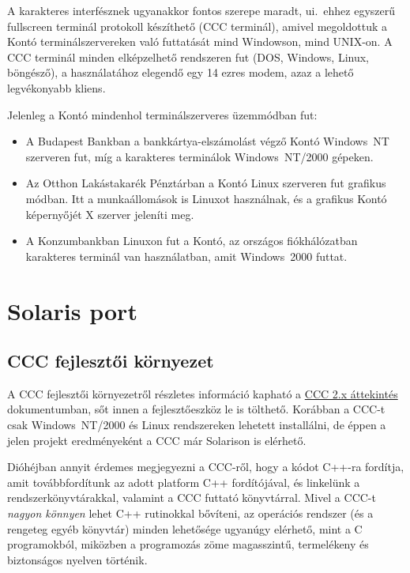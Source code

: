 A karakteres interfésznek ugyanakkor fontos szerepe maradt, ui.\
ehhez egyszerű fullscreen terminál protokoll készíthető (CCC terminál), 
amivel megoldottuk a Kontó terminálszervereken való futtatását mind Windowson,
mind UNIX-on. A CCC terminál minden elképzelhető rendszeren fut
(DOS, Windows, Linux, böngésző), a használatához elegendő egy 14 ezres
modem, azaz a lehető legvékonyabb kliens.

Jelenleg a Kontó mindenhol terminálszerveres üzemmódban fut:
\begin{itemize}
\item 
   A Budapest Bankban a bankkártya-elszámolást végző Kontó
   Windows~NT szerveren fut, míg a karakteres terminálok 
   Windows~NT/2000 gépeken.
\item 
   Az Otthon Lakástakarék Pénztárban a Kontó Linux szerveren fut
   grafikus módban. Itt a munkaállomások is Linuxot használnak, 
   és a grafikus Kontó képernyőjét X szerver jeleníti meg.
\item 
   A Konzumbankban Linuxon fut a Kontó, az országos fiókhálózatban
   karakteres terminál van használatban, amit Windows~2000 futtat.
\end{itemize}
 

\section{Solaris port}

\subsection{CCC fejlesztői környezet}

A CCC fejlesztői környezetről részletes információ kapható
a \href{http://www.comfirm.hu/ccc2/ccc2.html}{CCC 2.x áttekintés} 
dokumentumban, sőt innen a fejlesztőeszköz le is tölthető.
Korábban a CCC-t csak Windows~NT/2000 és Linux rendszereken 
lehetett installálni, de éppen a jelen projekt eredményeként
a CCC már Solarison is elérhető.

Dióhéjban annyit érdemes megjegyezni a CCC-ről, 
hogy a  kódot C++-ra fordítja, amit továbbfordítunk
az adott platform C++ fordítójával, és linkelünk a rendszerkönyvtárakkal,
valamint a CCC futtató könyvtárral. Mivel a CCC-t \textit{nagyon könnyen}
lehet C++ rutinokkal bővíteni,  az operációs rendszer 
(és a rengeteg egyéb könyvtár) minden lehetősége ugyanúgy elérhető, 
mint a C programokból, miközben a programozás zöme magasszintű, termelékeny
és biztonságos nyelven történik.


